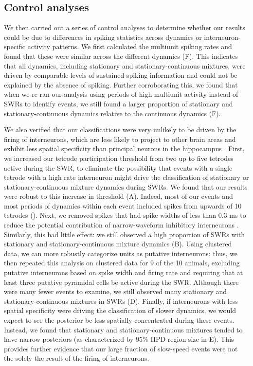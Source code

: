 \documentclass[9pt,lineno]{elife}
\begin{document}
\subsection*{Control analyses}

We then carried out a series of control analyses to determine whether our results could be due to differences in spiking statistics across dynamics or interneuron-specific activity patterns. We first calculated the multiunit spiking rates and found that these were similar across the different dynamics (F). This indicates that all dynamics, including stationary and stationary-continuous mixtures, were driven by comparable levels of sustained spiking information and could not be explained by the absence of spiking. Further corroborating this, we found that when we re-ran our analysis using periods of high multiunit activity instead of SWRs to identify events, we still found a larger proportion of stationary and stationary-continuous dynamics relative to the continuous dynamics (F).

We also verified that our classifications were very unlikely to be driven by the firing of interneurons, which are less likely to project to other brain areas and exhibit less spatial specificity than principal neurons in the hippocampus \citep{WilentDiscretePlaceFields2007, JinnoNeuronalDiversityGABAergic2007, HangyaComplementaryspatialfiring2010}. First, we increased our tetrode participation threshold from two up to five tetrodes active during the SWR, to eliminate the possibility that events with a single tetrode with a high rate interneuron might drive the classification of stationary or stationary-continuous mixture dynamics during SWRs. We found that our results were robust to this increase in threshold (A). Indeed, most of our events and most periods of dynamics within each event included spikes from upwards of 10 tetrodes (). Next, we removed spikes that had spike widths of less than 0.3 ms to reduce the potential contribution of narrow-waveform inhibitory interneurons \citep{FoxLocalizationanatomicalidentification1975}. Similarly, this had little effect: we still observed a high proportion of SWRs with stationary and stationary-continuous mixture dynamics (B). Using clustered data, we can more robustly categorize units as putative interneurons; thus, we then repeated this analysis on clustered data for 9 of the 10 animals, excluding putative interneurons based on spike width and firing rate and requiring that at least three putative pyramidal cells be active during the SWR. Although there were many fewer events to examine, we still observed many stationary and stationary-continuous mixtures in SWRs (D). Finally, if interneurons with less spatial specificity were driving the classification of slower dynamics, we would expect to see the posterior be less spatially concentrated during these events. Instead, we found that stationary and stationary-continuous mixtures tended to have narrow posteriors (as characterized by 95\% HPD region size in E). This provides further evidence that our large fraction of slow-speed events were not the solely the result of the firing of interneurons. 
\end{document}
